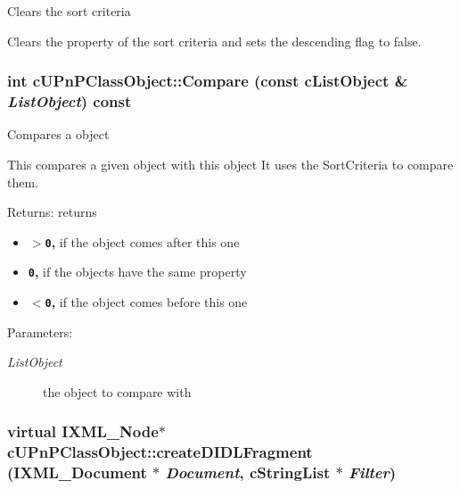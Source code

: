 Clears the sort criteria

Clears the property of the sort criteria and sets the descending flag to false. \hypertarget{classcUPnPClassObject_7297d228db4033bf8968eaee502131dd}{
\subsubsection[{Compare}]{\setlength{\rightskip}{0pt plus 5cm}int cUPnPClassObject::Compare (const cListObject \& {\em ListObject}) const}}
\label{classcUPnPClassObject_7297d228db4033bf8968eaee502131dd}


Compares a object

This compares a given object with this object It uses the SortCriteria to compare them.

\begin{Desc}
\item[Returns:]returns\begin{itemize}
\item {\bf {\tt $>$0},} if the object comes after this one\item {\bf {\tt 0},} if the objects have the same property\item {\bf {\tt $<$0},} if the object comes before this one \end{itemize}
\end{Desc}
\begin{Desc}
\item[Parameters:]
\begin{description}
\item[{\em ListObject}]the object to compare with \end{description}
\end{Desc}
\hypertarget{classcUPnPClassObject_9090f5982129bc5aa15c6e19db627445}{
\subsubsection[{createDIDLFragment}]{\setlength{\rightskip}{0pt plus 5cm}virtual IXML\_\-Node$\ast$ cUPnPClassObject::createDIDLFragment (IXML\_\-Document $\ast$ {\em Document}, \/  cStringList $\ast$ {\em Filter})}}
\label{classcUPnPClassObject_9090f5982129bc5aa15c6e19db627445}


